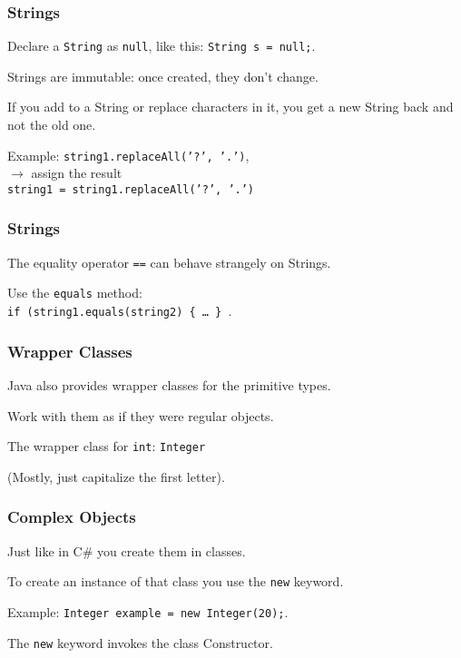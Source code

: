 \begin{frame}
\frametitle{Strings}
\begin{changemargin}{1cm}

Declare a \texttt{String} as \texttt{null}, like this: \texttt{String s = null;}.

Strings are immutable: once created, they don't change. 

If you add to a String or replace characters in it, you get a new String back and not the old one. 

Example: \texttt{string1.replaceAll('?', '.')}, \\
$\rightarrow$ assign the result\\
\texttt{string1 = string1.replaceAll('?', '.')}

\end{changemargin}
\end{frame}


\begin{frame}
\frametitle{Strings}
\begin{changemargin}{1cm}

The equality operator \texttt{==} can behave strangely on Strings. 

Use the \texttt{equals} method:\\
\quad \texttt{if (string1.equals(string2) \{ \ldots~\} }.

\end{changemargin}
\end{frame}


\begin{frame}
\frametitle{Wrapper Classes}
\begin{changemargin}{1cm}
Java also provides wrapper classes for the primitive types.

Work with them as if they were regular objects. 

The wrapper class for \texttt{int}: \texttt{Integer} 

(Mostly, just capitalize the first letter). 
\end{changemargin}
\end{frame}

\begin{frame}
\frametitle{Complex Objects}
\begin{changemargin}{1cm}
Just like in C\# you create them in classes. 

To create an instance of that class you use the \texttt{new} keyword. 

Example: \texttt{Integer example = new Integer(20);}. 

The \texttt{new} keyword invokes the class Constructor.
\end{changemargin}
\end{frame}

